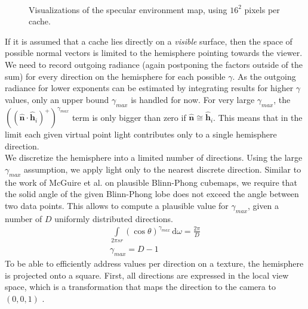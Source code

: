 \documentclass[thesis.tex]{subfiles}
\begin{document}
\begin{figure}[h!]
\centering
{}
\\
\caption{Visualizations of the specular environment map, using $16^2$ pixels per cache.}
\label{fig:specularenvmap}
\end{figure}
If it is assumed that a cache lies directly on a \emph{visible} surface, then the space of possible normal vectors is limited to the hemisphere pointing towards the viewer.
We need to record outgoing radiance (again postponing the factors outside of the sum) for every direction on  the hemisphere for each possible $\gamma$.
As the outgoing radiance for lower exponents can be estimated by integrating results for higher $\gamma$ values, only an upper bound $\gamma_{max}$ is handled for now.
For very large $\gamma_{max}$, the $((\hat{\mathbf{n}} \cdot \hat{\mathbf{h}}_i)^+)^{\gamma_{max}}$ term is only bigger than zero if $\hat{\mathbf{n}} \cong \hat{\mathbf{h}}_i$.
This means that in the limit each given virtual point light contributes only to a single hemisphere direction.
\\
We discretize the hemisphere into a limited number of directions.
Using the large $\gamma_{max}$ assumption, we apply light only to the nearest discrete direction.
Similar to the work of McGuire et al. \cite{bib:envmipmap} on plausible Blinn-Phong cubemaps, we require that the solid angle of the given Blinn-Phong lobe does not exceed the angle between two data points.
This allows to compute a plausible value for $\gamma_{max}$, given a number of $D$ uniformly distributed directions.
\begin{align}
\int\limits_{2\pi sr} (\cos\theta)^{\gamma_{max}}  \,\mathrm{d}\omega = \frac{2\pi}{D}\\
\gamma_{max} = D-1
\end{align}
%
To be able to efficiently address values per direction on a texture, the hemisphere is projected onto a square.
First, all directions are expressed in the local view space, which is a transformation that maps the direction to the camera to $(0,0,1)$ .
\end{document}
